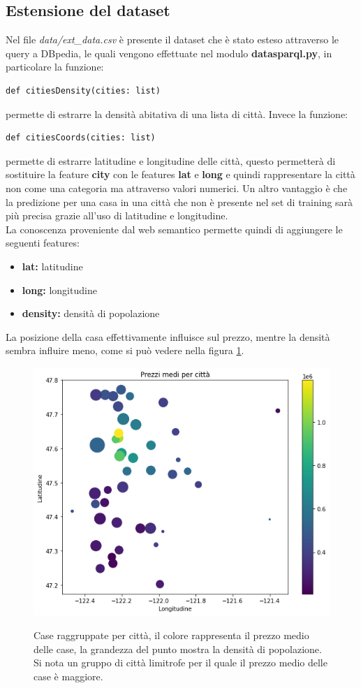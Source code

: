 \documentclass{article}
\begin{document}
\subsection{Estensione del dataset}
Nel file \textit{data/ext\_data.csv} è presente il dataset che è stato esteso
attraverso le query a DBpedia, le quali vengono effettuate nel modulo
\textbf{datasparql.py}, in particolare la funzione:
\begin{verbatim}
def citiesDensity(cities: list)
\end{verbatim}
permette di estrarre la densità abitativa di una lista di città. Invece la
funzione:
\begin{verbatim}
def citiesCoords(cities: list)
\end{verbatim}
permette di estrarre latitudine e longitudine delle città, questo permetterà di
sostituire la feature \textbf{city} con le features \textbf{lat} e
\textbf{long} e quindi rappresentare la città non come una categoria ma
attraverso valori numerici. Un altro vantaggio è che la predizione per una casa
in una città che non è presente nel set di training sarà più precisa grazie
all'uso di latitudine e longitudine. \\
La conoscenza proveniente dal web semantico permette quindi di aggiungere le
seguenti features:
\begin{itemize}
	\itemsep0em
	\item \textbf{lat:} latitudine
	\item \textbf{long:} longitudine
	\item \textbf{density:} densità di popolazione
\end{itemize}
La posizione della casa effettivamente influisce sul prezzo, mentre la densità
sembra influire meno, come si può vedere nella figura \ref{fig:cities}.
\begin{figure}[ht]
	\centering
	\includegraphics[scale=0.4]{cities}
	\label{fig:cities}
	\caption{Case raggruppate per città, il colore rappresenta il prezzo
	medio delle case, la grandezza del punto mostra la densità di popolazione.
	Si nota un gruppo di città limitrofe per il quale il prezzo medio delle
	case è maggiore.}
\end{figure}
\end{document}
